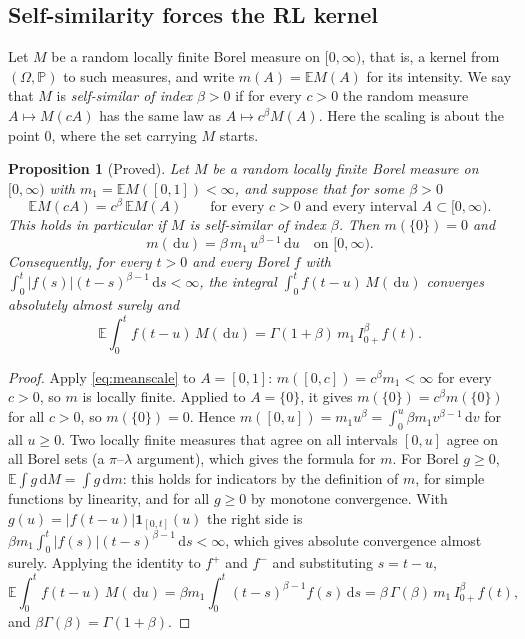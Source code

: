 \documentclass[11pt]{article}
\newtheorem{proposition}[theorem]{Proposition}
\theoremstyle{remark}
\theoremstyle{definition}
\newcommand{\E}{\mathbb{E}}
\newcommand{\Prob}{\mathbb{P}}
\newcommand{\dd}{\,\mathrm{d}}
\begin{document}
\subsection{Self-similarity forces the RL kernel}
Let $M$ be a random locally finite Borel measure on $[0,\infty)$, that is, a kernel from $(\Omega,\Prob)$ to such measures, and write $m(A)=\E M(A)$ for its intensity. We say that $M$ is \emph{self-similar of index $\beta>0$} if for every $c>0$ the random measure $A\mapsto M(cA)$ has the same law as $A\mapsto c^\beta M(A)$. Here the scaling is about the point $0$, where the set carrying $M$ starts.

\begin{proposition}[Proved]\label{prop:selfsim}
Let $M$ be a random locally finite Borel measure on $[0,\infty)$ with $m_1=\E M([0,1])<\infty$, and suppose that for some $\beta>0$
\begin{equation}\label{eq:meanscale}
\E M(cA)=c^\beta\,\E M(A)\qquad\text{for every } c>0 \text{ and every interval } A\subset[0,\infty).
\end{equation}
This holds in particular if $M$ is self-similar of index $\beta$. Then $m(\{0\})=0$ and
\[
m(\dd u)=\beta\,m_1\,u^{\beta-1}\dd u\quad\text{on }[0,\infty).
\]
Consequently, for every $t>0$ and every Borel $f$ with $\int_0^t|f(s)|(t-s)^{\beta-1}\dd s<\infty$, the integral $\int_0^t f(t-u)\,M(\dd u)$ converges absolutely almost surely and
\begin{equation}\label{eq:selfsim}
\E\int_0^t f(t-u)\,M(\dd u)=\Gamma(1+\beta)\,m_1\,I^\beta_{0+}f(t).
\end{equation}
\end{proposition}

\begin{proof}
Apply \eqref{eq:meanscale} to $A=[0,1]$: $m([0,c])=c^\beta m_1<\infty$ for every $c>0$, so $m$ is locally finite. Applied to $A=\{0\}$, it gives $m(\{0\})=c^\beta m(\{0\})$ for all $c>0$, so $m(\{0\})=0$. Hence $m([0,u])=m_1u^\beta=\int_0^u\beta m_1v^{\beta-1}\dd v$ for all $u\ge0$. Two locally finite measures that agree on all intervals $[0,u]$ agree on all Borel sets (a $\pi$--$\lambda$ argument), which gives the formula for $m$. For Borel $g\ge0$, $\E\int g\dd M=\int g\dd m$: this holds for indicators by the definition of $m$, for simple functions by linearity, and for all $g\ge0$ by monotone convergence. With $g(u)=|f(t-u)|\mathbf 1_{[0,t]}(u)$ the right side is $\beta m_1\int_0^t|f(s)|(t-s)^{\beta-1}\dd s<\infty$, which gives absolute convergence almost surely. Applying the identity to $f^+$ and $f^-$ and substituting $s=t-u$,
\[
\E\int_0^t f(t-u)\,M(\dd u)=\beta m_1\int_0^t(t-s)^{\beta-1}f(s)\dd s=\beta\,\Gamma(\beta)\,m_1\,I^\beta_{0+}f(t),
\]
and $\beta\Gamma(\beta)=\Gamma(1+\beta)$.
\end{proof}
\end{document}
